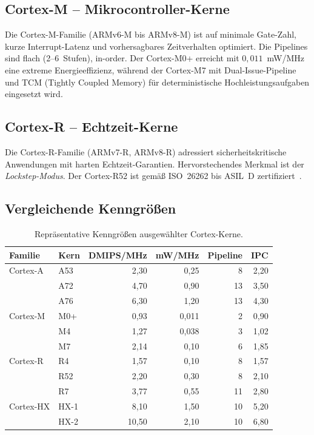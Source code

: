 ﻿\documentclass[a4paper,12pt]{article}
\theoremstyle{plain}
\theoremstyle{definition}
\theoremstyle{remark}
\begin{document}
\subsection{Cortex-M -- Mikrocontroller-Kerne}

Die Cortex-M-Familie (ARMv6-M bis ARMv8-M) ist auf minimale Gate-Zahl, kurze
Interrupt-Latenz und vorhersagbares Zeitverhalten optimiert. Die Pipelines sind
flach (2--6~Stufen), in-order. Der Cortex-M0+ erreicht mit $0{,}011$~mW/MHz eine
extreme Energieeffizienz, w\"ahrend der Cortex-M7 mit Dual-Issue-Pipeline und
TCM (Tightly Coupled Memory) f\"ur deterministische Hochleistungsaufgaben eingesetzt wird.

\subsection{Cortex-R -- Echtzeit-Kerne}

Die Cortex-R-Familie (ARMv7-R, ARMv8-R) adressiert sicherheitskritische Anwendungen
mit harten Echtzeit-Garantien. Hervorstechendes Merkmal ist der \emph{Lockstep-Modus}.
Der Cortex-R52 ist gem\"a\ss{} ISO~26262 bis ASIL~D zertifiziert~\cite{iso26262}.

\subsection{Vergleichende Kenngr\"o\ss{}en}

\begin{table}[H]
\centering
\caption{Repr\"asentative Kenngr\"o\ss{}en ausgew\"ahlter Cortex-Kerne.}
\label{tab:cores}
\renewcommand{\arraystretch}{1.3}
\begin{tabular}{llrrrr}
\toprule
Familie & Kern & DMIPS/MHz & mW/MHz & Pipeline & IPC \\
\midrule
\textcolor{colA}{Cortex-A} & A53  & 2{,}30 & 0{,}25  &  8 & 2{,}20 \\
                            & A72  & 4{,}70 & 0{,}90  & 13 & 3{,}50 \\
                            & A76  & 6{,}30 & 1{,}20  & 13 & 4{,}30 \\
\textcolor{colM}{Cortex-M} & M0+  & 0{,}93 & 0{,}011 &  2 & 0{,}90 \\
                            & M4   & 1{,}27 & 0{,}038 &  3 & 1{,}02 \\
                            & M7   & 2{,}14 & 0{,}10  &  6 & 1{,}85 \\
\textcolor{colR}{Cortex-R} & R4   & 1{,}57 & 0{,}10  &  8 & 1{,}57 \\
                            & R52  & 2{,}20 & 0{,}30  &  8 & 2{,}10 \\
                            & R7   & 3{,}77 & 0{,}55  & 11 & 2{,}80 \\
\textcolor{colH}{Cortex-HX}& HX-1 & 8{,}10 & 1{,}50  & 10 & 5{,}20 \\
                            & HX-2 &10{,}50 & 2{,}10  & 10 & 6{,}80 \\
\bottomrule
\end{tabular}
\end{table}
\end{document}
